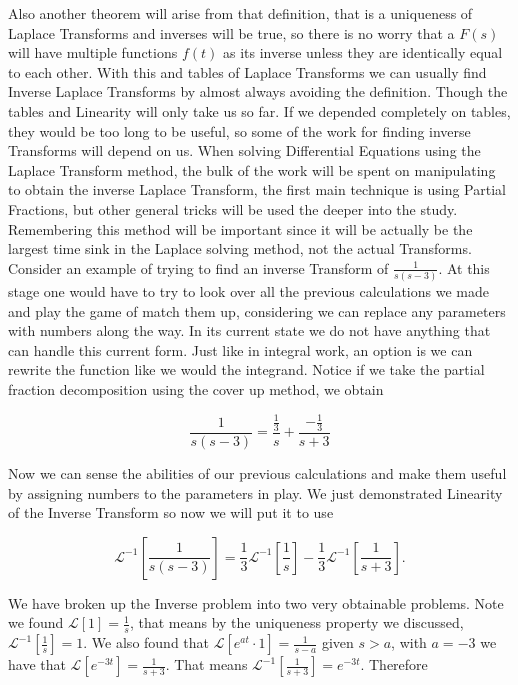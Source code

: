 \documentclass[12pt]{article}
\newcommand{\lp}{\mathscr{L}}
\begin{document}
Also another theorem will arise from that definition, that is a uniqueness of Laplace Transforms and inverses will be true, so there is no worry that a $F(s)$ will have multiple functions $f(t)$ as its inverse unless they are identically equal to each other. With this and tables of Laplace Transforms we can usually find Inverse Laplace Transforms by almost always avoiding the definition. Though the tables and Linearity will only take us so far. If we depended completely on tables, they would be too long to be useful, so some of the work for finding inverse Transforms will depend on us. When solving Differential Equations using the Laplace Transform method, the bulk of the work will be spent on manipulating to obtain the inverse Laplace Transform, the first main technique is using Partial Fractions, but other general tricks will be used the deeper into the study. Remembering this method will be important since it will be actually be the largest time sink in the Laplace solving method, not the actual Transforms. \\

Consider an example of trying to find an inverse Transform of $\frac{1}{s(s-3)}$. At this stage one would have to try to look over all the previous calculations we made and play the game of match them up, considering we can replace any parameters with numbers along the way. In its current state we do not have anything that can handle this current form. Just like in integral work, an option is we can rewrite the function like we would the integrand. Notice if we take the partial fraction decomposition using the cover up method, we obtain

\begin{equation*}
    \frac{1}{s(s-3)} = \frac{\frac{1}{3}}{s} + \frac{-\frac{1}{3}}{s+3}
\end{equation*}

Now we can sense the abilities of our previous calculations and make them useful by assigning numbers to the parameters in play. We just demonstrated Linearity of the Inverse Transform so now we will put it to use

\begin{equation*}
    \lp^{-1} \left[\frac{1}{s(s-3)}\right] = \frac{1}{3}\lp^{-1}\left[\frac{1}{s}\right] - \frac{1}{3}\lp^{-1}\left[\frac{1}{s+3}\right].
\end{equation*}

We have broken up the Inverse problem into two very obtainable problems. Note we found $\lp[1]=\frac{1}{s}$, that means by the uniqueness property we discussed, $\lp^{-1}[\frac{1}{s}]=1$. We also found that $\lp[e^{at} \cdot 1]=\frac{1}{s-a}$ given $s>a$, with $a=-3$ we have that $\lp[e^{-3t}]=\frac{1}{s+3}$. That means $\lp^{-1}[\frac{1}{s+3}]=e^{-3t}$. Therefore
\end{document}
